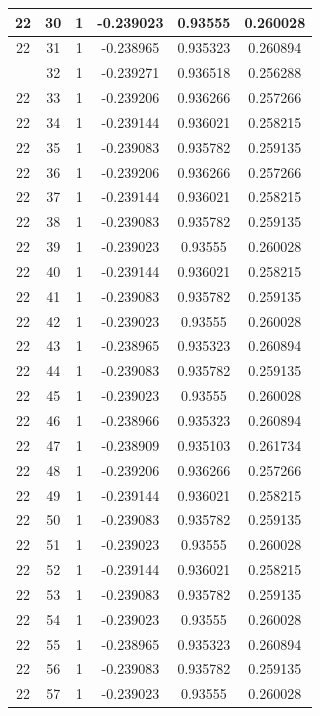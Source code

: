 \documentclass[12pt,a4paper]{article}
\numberwithin{equation}{section}
\numberwithin{figure}{section}
\numberwithin{table}{section}
\begin{document}
\begin{longtable}{|c|c|c|c|c|c|}
22 & 30 & 1 & -0.239023 & 0.93555 & 0.260028 \\ \hline
22 & 31 & 1 & -0.238965 & 0.935323 & 0.260894 \\ \hline
\pagebreak
22 & 32 & 1 & -0.239271 & 0.936518 & 0.256288 \\ \hline
22 & 33 & 1 & -0.239206 & 0.936266 & 0.257266 \\ \hline
22 & 34 & 1 & -0.239144 & 0.936021 & 0.258215 \\ \hline
22 & 35 & 1 & -0.239083 & 0.935782 & 0.259135 \\ \hline
22 & 36 & 1 & -0.239206 & 0.936266 & 0.257266 \\ \hline
22 & 37 & 1 & -0.239144 & 0.936021 & 0.258215 \\ \hline
22 & 38 & 1 & -0.239083 & 0.935782 & 0.259135 \\ \hline
22 & 39 & 1 & -0.239023 & 0.93555 & 0.260028 \\ \hline
22 & 40 & 1 & -0.239144 & 0.936021 & 0.258215 \\ \hline
22 & 41 & 1 & -0.239083 & 0.935782 & 0.259135 \\ \hline
22 & 42 & 1 & -0.239023 & 0.93555 & 0.260028 \\ \hline
22 & 43 & 1 & -0.238965 & 0.935323 & 0.260894 \\ \hline
22 & 44 & 1 & -0.239083 & 0.935782 & 0.259135 \\ \hline
22 & 45 & 1 & -0.239023 & 0.93555 & 0.260028 \\ \hline
22 & 46 & 1 & -0.238966 & 0.935323 & 0.260894 \\ \hline
22 & 47 & 1 & -0.238909 & 0.935103 & 0.261734 \\ \hline
22 & 48 & 1 & -0.239206 & 0.936266 & 0.257266 \\ \hline
22 & 49 & 1 & -0.239144 & 0.936021 & 0.258215 \\ \hline
22 & 50 & 1 & -0.239083 & 0.935782 & 0.259135 \\ \hline
22 & 51 & 1 & -0.239023 & 0.93555 & 0.260028 \\ \hline
22 & 52 & 1 & -0.239144 & 0.936021 & 0.258215 \\ \hline
22 & 53 & 1 & -0.239083 & 0.935782 & 0.259135 \\ \hline
22 & 54 & 1 & -0.239023 & 0.93555 & 0.260028 \\ \hline
22 & 55 & 1 & -0.238965 & 0.935323 & 0.260894 \\ \hline
22 & 56 & 1 & -0.239083 & 0.935782 & 0.259135 \\ \hline
22 & 57 & 1 & -0.239023 & 0.93555 & 0.260028 \\ \hline

\end{longtable}
\end{document}
